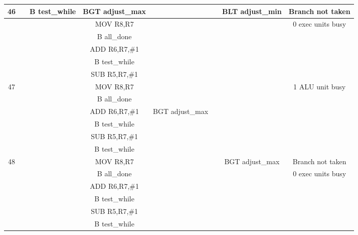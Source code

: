 \documentclass{article}
\begin{document}
{\begin{landscape}
\begin{longtable}{|c|c|c|c|c:c|c|c|}
    46 & & B test\_while & BGT adjust\_max & & & BLT adjust\_min & Branch not taken \\ \hline
     & & & MOV R8,R7 & & & & 0 exec units busy \\ \hline
     & & & B all\_done & &  & & \\ \hline
     &  &  & ADD R6,R7,\#1 & &  & & \\ \hline
     &  &  & B test\_while &  &  &  & \\ \hline
     &  &  & SUB R5,R7,\#1 &  &  &  & \\ \hline \hline
     
    47 & & & MOV R8,R7 & & & & 1 ALU unit busy \\ \hline
     & & & B all\_done & & & & \\ \hline
     & & & ADD R6,R7,\#1 & BGT adjust\_max &  & & \\ \hline
     &  &  & B test\_while & &  & & \\ \hline
     &  &  & SUB R5,R7,\#1 &  &  &  & \\ \hline
     &  &  & B test\_while &  &  &  & \\ \hline \hline
     
    48 & & & MOV R8,R7 & & & BGT adjust\_max & Branch not taken \\ \hline
     & & & B all\_done & & & & 0 exec units busy \\ \hline
     & & & ADD R6,R7,\#1 & &  & & \\ \hline
     &  &  & B test\_while & &  & & \\ \hline
     &  &  & SUB R5,R7,\#1 &  &  &  & \\ \hline
     &  &  & B test\_while &  &  &  & \\ \hline \hline
    

\end{longtable}
\end{landscape}}
\end{document}
